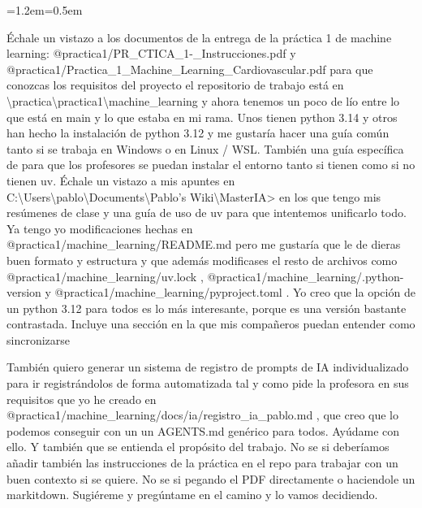 \documentclass[11pt,a4paper]{article}
\newenvironment{prompt}
  {\par\smallskip\begin{list}{}{\leftmargin=1.2em\rightmargin=0.5em}\item\relax\small\color{black!80}}
  {\end{list}\smallskip}
\begin{document}
\begin{prompt}
Échale un vistazo a los documentos de la entrega de la práctica 1 de machine learning: @practica1/\allowbreak{}PR\_\allowbreak{}CTICA\_\allowbreak{}1-\_\allowbreak{}Instrucciones.pdf  y @practica1/\allowbreak{}Practica\_\allowbreak{}1\_\allowbreak{}Machine\_\allowbreak{}Learning\_\allowbreak{}Cardiovascular.pdf  para que conozcas los requisitos del proyecto el repositorio de trabajo está en  \textbackslash\allowbreak{}practica\textbackslash\allowbreak{}practica1\textbackslash\allowbreak{}machine\_\allowbreak{}learning y ahora tenemos un poco de lío entre lo que está en main y lo que estaba en mi rama. Unos tienen python 3.14 y otros han hecho la instalación de python 3.12 y me gustaría hacer una guía común tanto si se trabaja en Windows o en Linux /\allowbreak{} WSL. También una guía específica de para que los profesores se puedan instalar el entorno tanto si tienen como si no tienen uv. Échale un vistazo a mis apuntes en C:\textbackslash\allowbreak{}Users\textbackslash\allowbreak{}pablo\textbackslash\allowbreak{}Documents\textbackslash\allowbreak{}Pablo's Wiki\textbackslash\allowbreak{}MasterIA\textgreater{} en los que tengo mis resúmenes de clase y una guía de uso de uv para que intentemos unificarlo todo. Ya tengo yo modificaciones hechas en @practica1/\allowbreak{}machine\_\allowbreak{}learning/\allowbreak{}README.md  pero me gustaría que le de dieras buen formato y estructura y que además modificases el resto de archivos como @practica1/\allowbreak{}machine\_\allowbreak{}learning/\allowbreak{}uv.lock , @practica1/\allowbreak{}machine\_\allowbreak{}learning/\allowbreak{}.python-version  y @practica1/\allowbreak{}machine\_\allowbreak{}learning/\allowbreak{}pyproject.toml . Yo creo que la opción de un python 3.12 para todos es lo más interesante, porque es una versión bastante contrastada. Incluye una sección en la que mis compañeros puedan entender como sincronizarse

También quiero generar un sistema de registro de prompts de IA individualizado para ir registrándolos de forma automatizada tal y como pide la profesora en sus requisitos que yo he creado en @practica1/\allowbreak{}machine\_\allowbreak{}learning/\allowbreak{}docs/\allowbreak{}ia/\allowbreak{}registro\_\allowbreak{}ia\_\allowbreak{}pablo.md  , que creo que lo podemos conseguir con un un AGENTS.md genérico para todos. Ayúdame con ello. Y también que se entienda el propósito del trabajo. No se si deberíamos añadir también las instrucciones de la práctica en el repo para trabajar con un buen contexto si se quiere. No se si pegando el PDF directamente o haciendole un markitdown. Sugiéreme y pregúntame en el camino y lo vamos decidiendo.
\end{prompt}
\end{document}
